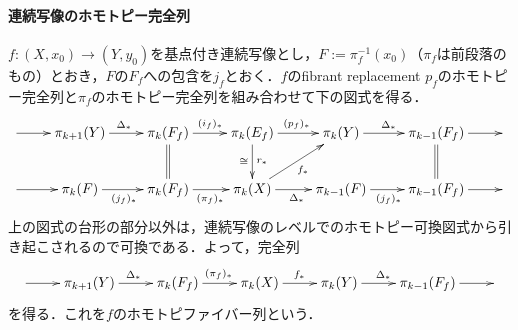 \documentclass[a4paper,11pt]{jsarticle}
\theoremstyle{definition}
\begin{document}
\paragraph{連続写像のホモトピー完全列}
$f\colon (X,x_0)\to (Y,y_0)$を基点付き連続写像とし，$F:=\pi_f^{-1}(x_0)$（$\pi_f$は前段落のもの）とおき，$F$の$F_f$への包含を$j_f$とおく．$f$のfibrant replacement $p_f$のホモトピー完全列と$\pi_f$のホモトピー完全列を組み合わせて下の図式を得る．
\[\xymatrix{
  \ar[r]&
  \pi_{k+1}(Y)\ar[r]^{\Delta_*}&
  \pi_{k}(F_f)\ar[r]^{(i_f)_*}\ar@{=}[d]&
  \pi_k(E_f)\ar[r]^{(p_f)_*}\ar[d]^{r_*}_{\cong}&
  \pi_{k}(Y)\ar[r]^{\Delta_*}&
  \pi_{k-1}(F_f)\ar[r]\ar@{=}[d]&
  \\
  \ar[r]&
  \pi_k(F)\ar[r]_{(j_{f})_*}&
  \pi_k(F_f)\ar[r]_{(\pi_f)_*}&
  \pi_k(X)\ar[r]_{\Delta_*}\ar[ru]_{f_*}&
  \pi_{k-1}(F)\ar[r]_{(j_{f})_*}&
  \pi_{k-1}(F_f)\ar[r]&
}\]
上の図式の台形の部分以外は，連続写像のレベルでのホモトピー可換図式から引き起こされるので可換である．よって，完全列
\[\xymatrix{
  \ar[r]&
  \pi_{k+1}(Y)\ar[r]^{\Delta_*}&
  \pi_k(F_f)\ar[r]^{(\pi_f)_*}&
  \pi_k(X)\ar[r]^{f_*}&
  \pi_k(Y)\ar[r]^{\Delta_*}&
  \pi_{k-1}(F_f)\ar[r]&
}\]
を得る．これを$f$のホモトピファイバー列という．



\end{document}
